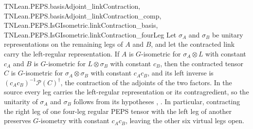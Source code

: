 \begin{lemma}
{        TNLean.PEPS.basisAdjoint_linkContraction,
        TNLean.PEPS.basisAdjoint_linkContraction_comp,
        TNLean.PEPS.IsGIsometric.linkContraction_basis,
        TNLean.PEPS.IsGIsometric.linkContraction_fourLeg}
    \leanok
    Let $\sigma_{A}$ and $\sigma_{B}$ be unitary representations on the remaining
    legs of $A$ and $B$, and let the contracted link carry the left-regular
    representation. If $A$ is $G$-isometric for $\sigma_{A}\otimes L$ with
    constant $c_{A}$ and $B$ is $G$-isometric for $L\otimes\sigma_{B}$ with
    constant $c_{B}$, then the contracted tensor $C$ is $G$-isometric for
    $\sigma_{A}\otimes\sigma_{B}$ with constant $c_{A}c_{B}$, and its left
    inverse is $(c_{A}c_{B})^{-1}\mathcal{P}(C)^{\dagger}$, the contraction of
    the adjoints of the two factors. In the source every leg carries the
    left-regular representation or its contragredient, so the unitarity of
    $\sigma_{A}$ and $\sigma_{B}$ follows from its hypotheses
    \cite[Lemma~6.2]{Schuch2010PEPS},
    \cite{gap:rmp_peps_quantum_double_g_isometry}.
    In particular, contracting the right leg of one four-leg regular PEPS
    tensor with the left leg of another preserves $G$-isometry with
    constant $c_Ac_B$, leaving the other six virtual legs open.

    \begin{center}
        \tenkzkernel
        \begin{tenkz}[rows={wire},cols=2,bonds=none]
        \end{tenkz}
    \end{center}
\end{lemma}

